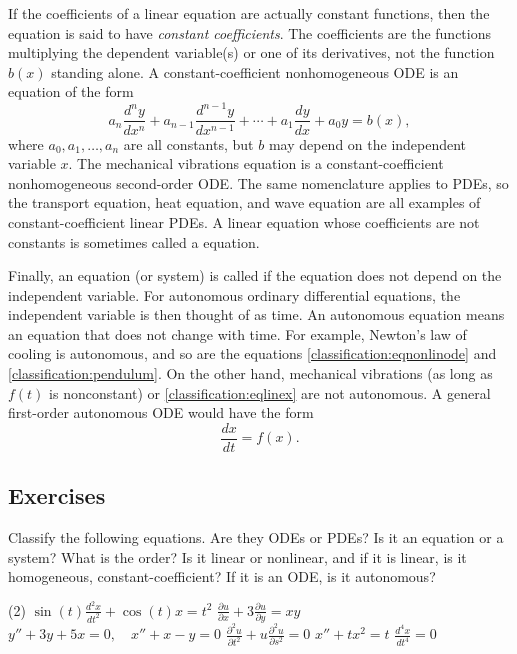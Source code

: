 \medskip

If the coefficients of a linear equation are actually constant functions,
then the equation is said to have
\emph{constant coefficients}.
The coefficients are the functions multiplying the dependent
variable(s) or one of its derivatives, not the function $b(x)$ standing alone.
A constant-coefficient nonhomogeneous ODE is an equation of the form
\begin{equation*}
a_n \frac{d^n y}{dx^n} +
a_{n-1} \frac{d^{n-1} y}{dx^{n-1}} +
\cdots
+
a_{1} \frac{dy}{dx}
+
a_{0} y = b(x) ,
\end{equation*}
where $a_0, a_1, \ldots, a_n$ are all constants,
but $b$ may depend on
the independent variable $x$.
The mechanical vibrations equation
is a constant-coefficient nonhomogeneous second-order ODE\@.
The same nomenclature applies to PDEs, so the transport equation,
heat equation, and wave equation are all examples of
constant-coefficient linear PDEs.
A linear equation whose coefficients are not constants is sometimes
called a \emph{} equation.

\medskip

Finally, an equation (or system) is called \emph{}
if the equation does not depend on the independent variable.
For autonomous ordinary differential equations, the
independent variable is then thought of as time.
An autonomous equation
means an equation that does not change with time.
For example, Newton's law of cooling is autonomous, and so are the equations
\eqref{classification:eqnonlinode} and
\eqref{classification:pendulum}.  On the other hand, mechanical
vibrations (as long as $f(t)$ is nonconstant) or
\eqref{classification:eqlinex} are not autonomous.
A general
first-order autonomous ODE would have the form
\begin{equation*}
\frac{dx}{dt} = f(x) .
\end{equation*}

\pagebreak[3]
\subsection{Exercises}

\begin{exercise}
Classify the following equations.  Are they ODEs or PDEs?  Is it an equation
or a system?  What is the order?  Is it linear or nonlinear, and if it is
linear, is it homogeneous, constant-coefficient?  If it is an ODE\@, is it
autonomous?
\begin{tasks}(2)
\task $\displaystyle \sin(t) \frac{d^2 x}{dt^2} + \cos(t) x = t^2$
\task $\displaystyle \frac{\partial u}{\partial x} + 3 \frac{\partial u}{\partial y} = xy$
\task $\displaystyle y''+3y+5x=0, \quad x''+x-y=0$
\task $\displaystyle \frac{\partial^2 u}{\partial t^2} + u\frac{\partial^2 u}{\partial s^2} =
0$
\task $\displaystyle x''+tx^2=t$
\task $\displaystyle \frac{d^4 x}{dt^4} = 0$
\end{tasks}
\end{exercise}

